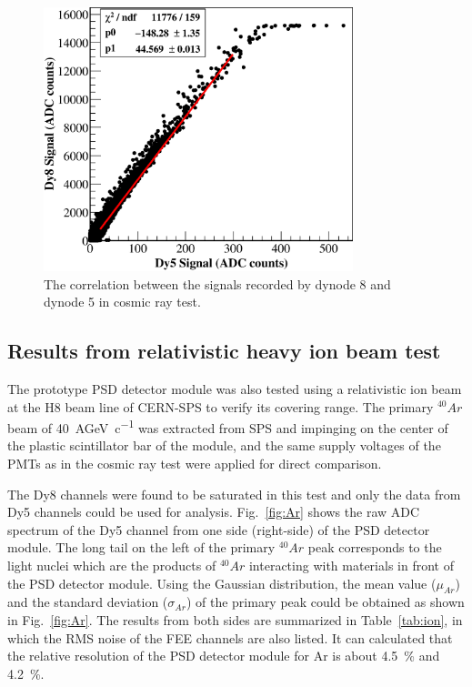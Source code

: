 \documentclass[preprint, times]{elsarticle}
\begin{document}
\begin{figure}
    \centering
    \includegraphics[width=90mm]{dy58}
    \caption{The correlation between the signals recorded by dynode 8 and dynode 5 in cosmic ray test.}
    \label{fig:dy58}
\end{figure}

\subsection{Results from relativistic heavy ion beam test}
\label{sec:beam}
The prototype PSD detector module was also tested using a relativistic ion beam at the H8 beam line of CERN-SPS to verify its covering range.
The primary $^{40}{Ar}$ beam of \SI{40}{AGeV\per c} was extracted from SPS and impinging on the center of the plastic scintillator bar of the module, and the same supply voltages of the PMTs as in the cosmic ray test were applied for direct comparison.

The Dy8 channels were found to be saturated in this test and only the data from Dy5 channels could be used for analysis.
Fig.~\ref{fig:Ar} shows the raw ADC spectrum of the Dy5 channel from one side (right-side) of the PSD detector module.
The long tail on the left of the primary $^{40}Ar$ peak corresponds to the light nuclei which are the products of $^{40}Ar$ interacting with materials in front of the PSD detector module.
Using the Gaussian distribution, the mean value ($\mu_{Ar}$) and the standard deviation ($\sigma_{Ar}$) of the primary peak could be obtained as shown in Fig.~\ref{fig:Ar}.
The results from both sides are summarized in Table~\ref{tab:ion}, in which the RMS noise of the FEE channels are also listed.
It can calculated that the relative resolution of the PSD detector module for Ar is about \SI{4.5}{\percent} and \SI{4.2}{\percent}.
 
\end{document}
